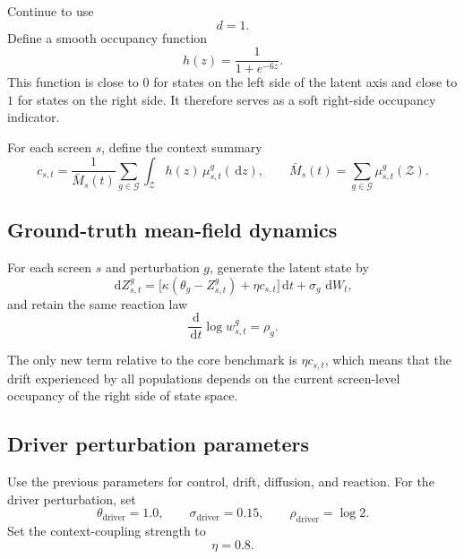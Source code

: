 \documentclass[11pt]{article}
\newcommand{\dd}{\,\mathrm{d}}
\newcommand{\Gcal}{\mathcal{G}}
\newcommand{\Zcal}{\mathcal{Z}}
\begin{document}
Continue to use
\[
d=1.
\]
Define a smooth occupancy function
\begin{equation}
h(z) = \frac{1}{1+e^{-6z}}.
\label{eq:occupancy_function}
\end{equation}
This function is close to \(0\) for states on the left side of the latent axis and close to \(1\) for states on the right side. It therefore serves as a soft right-side occupancy indicator.

For each screen \(s\), define the context summary
\begin{equation}
c_{s,t}
=
\frac{1}{\bar M_s(t)}
\sum_{g\in\Gcal}
\int_{\Zcal} h(z)\,\mu_{s,t}^g(\dd z),
\qquad
\bar M_s(t)=\sum_{g\in\Gcal}\mu_{s,t}^g(\Zcal).
\label{eq:screen_context}
\end{equation}

\subsection{Ground-truth mean-field dynamics}

For each screen \(s\) and perturbation \(g\), generate the latent state by
\begin{equation}
\dd Z_{s,t}^g
=
\Big[
\kappa(\theta_g-Z_{s,t}^g) + \eta c_{s,t}
\Big]\dd t
+
\sigma_g\,\dd W_t,
\label{eq:mf_truth_state}
\end{equation}
and retain the same reaction law
\begin{equation}
\frac{\dd}{\dd t}\log w_{s,t}^g = \rho_g.
\label{eq:mf_truth_weight}
\end{equation}

The only new term relative to the core benchmark is \(\eta c_{s,t}\), which means that the drift experienced by all populations depends on the current screen-level occupancy of the right side of state space.

\subsection{Driver perturbation parameters}

Use the previous parameters for control, drift, diffusion, and reaction. For the driver perturbation, set
\begin{equation}
\theta_{\mathrm{driver}} = 1.0,
\qquad
\sigma_{\mathrm{driver}} = 0.15,
\qquad
\rho_{\mathrm{driver}} = \log 2.
\label{eq:driver_params}
\end{equation}
Set the context-coupling strength to
\begin{equation}
\eta = 0.8.
\label{eq:eta_value}
\end{equation}
\end{document}
